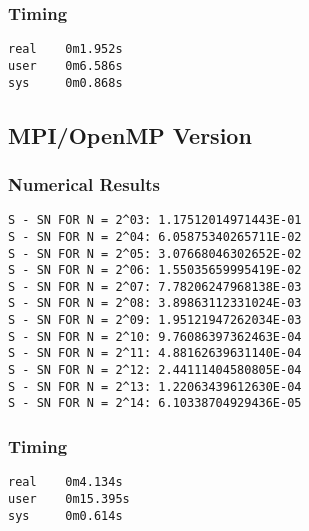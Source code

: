 \documentclass[a4paper, 12pt]{article}
\begin{document}
        \subsubsection{Timing} %
\begin{verbatim}
real    0m1.952s
user    0m6.586s
sys     0m0.868s
\end{verbatim}        

    \subsection{MPI/OpenMP Version} %
        \subsubsection{Numerical Results} %
        \begin{verbatim}
S - SN FOR N = 2^03: 1.17512014971443E-01
S - SN FOR N = 2^04: 6.05875340265711E-02
S - SN FOR N = 2^05: 3.07668046302652E-02
S - SN FOR N = 2^06: 1.55035659995419E-02
S - SN FOR N = 2^07: 7.78206247968138E-03
S - SN FOR N = 2^08: 3.89863112331024E-03
S - SN FOR N = 2^09: 1.95121947262034E-03
S - SN FOR N = 2^10: 9.76086397362463E-04
S - SN FOR N = 2^11: 4.88162639631140E-04
S - SN FOR N = 2^12: 2.44111404580805E-04
S - SN FOR N = 2^13: 1.22063439612630E-04
S - SN FOR N = 2^14: 6.10338704929436E-05
        \end{verbatim}
        \subsubsection{Timing} %
\begin{verbatim}
real    0m4.134s
user    0m15.395s
sys     0m0.614s
\end{verbatim}        

\end{document}
